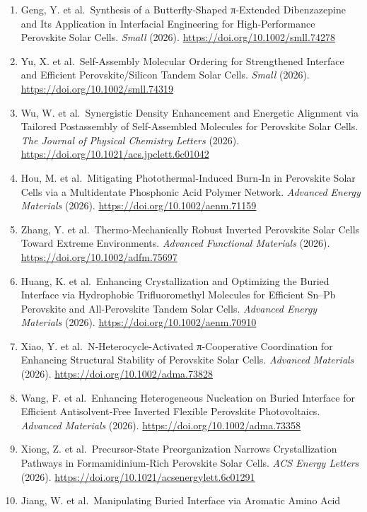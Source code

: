 \documentclass[
  11pt,
]{article}
\begin{document}
\begin{enumerate}
  \url{https://doi.org/10.1002/aenm.70814}
\item
  Geng, Y. et al.~Synthesis of a Butterfly‐Shaped π‐Extended
  Dibenzazepine and Its Application in Interfacial Engineering for
  High‐Performance Perovskite Solar Cells. \emph{Small} (2026).
  \url{https://doi.org/10.1002/smll.74278}
\item
  Yu, X. et al.~Self‐Assembly Molecular Ordering for Strengthened
  Interface and Efficient Perovskite/Silicon Tandem Solar Cells.
  \emph{Small} (2026). \url{https://doi.org/10.1002/smll.74319}
\item
  Wu, W. et al.~Synergistic Density Enhancement and Energetic Alignment
  via Tailored Postassembly of Self-Assembled Molecules for Perovskite
  Solar Cells. \emph{The Journal of Physical Chemistry Letters} (2026).
  \url{https://doi.org/10.1021/acs.jpclett.6c01042}
\item
  Hou, M. et al.~Mitigating Photothermal‐Induced Burn‐In in Perovskite
  Solar Cells via a Multidentate Phosphonic Acid Polymer Network.
  \emph{Advanced Energy Materials} (2026).
  \url{https://doi.org/10.1002/aenm.71159}
\item
  Zhang, Y. et al.~Thermo‐Mechanically Robust Inverted Perovskite Solar
  Cells Toward Extreme Environments. \emph{Advanced Functional
  Materials} (2026). \url{https://doi.org/10.1002/adfm.75697}
\item
  Huang, K. et al.~Enhancing Crystallization and Optimizing the Buried
  Interface via Hydrophobic Trifluoromethyl Molecules for Efficient
  Sn--Pb Perovskite and All‐Perovskite Tandem Solar Cells.
  \emph{Advanced Energy Materials} (2026).
  \url{https://doi.org/10.1002/aenm.70910}
\item
  Xiao, Y. et al.~N‐Heterocycle‐Activated π‐Cooperative Coordination for
  Enhancing Structural Stability of Perovskite Solar Cells.
  \emph{Advanced Materials} (2026).
  \url{https://doi.org/10.1002/adma.73828}
\item
  Wang, F. et al.~Enhancing Heterogeneous Nucleation on Buried Interface
  for Efficient Antisolvent‐Free Inverted Flexible Perovskite
  Photovoltaics. \emph{Advanced Materials} (2026).
  \url{https://doi.org/10.1002/adma.73358}
\item
  Xiong, Z. et al.~Precursor-State Preorganization Narrows
  Crystallization Pathways in Formamidinium-Rich Perovskite Solar Cells.
  \emph{ACS Energy Letters} (2026).
  \url{https://doi.org/10.1021/acsenergylett.6c01291}
\item
  Jiang, W. et al.~Manipulating Buried Interface via Aromatic Amino Acid

\end{enumerate}
\end{document}
